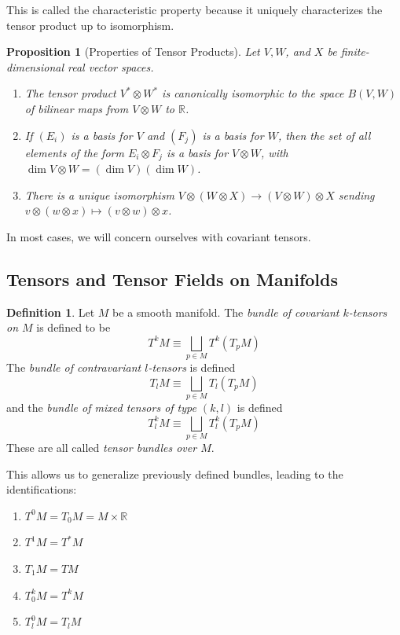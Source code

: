 \documentclass{article}
\newtheorem{proposition}[theorem]{Proposition}
\theoremstyle{remark}
\theoremstyle{definition}
\newtheorem{definition}{Definition}[section]
\begin{document}
This is called the characteristic property because it uniquely characterizes the tensor product up to isomorphism. 

\begin{proposition}[Properties of Tensor Products]
Let $V, W$, and $X$ be finite-dimensional real vector spaces. 
\begin{enumerate}
    \item The tensor product $V^* \otimes W^*$ is canonically isomorphic to the space $B(V, W)$ of bilinear maps from $V \otimes W$ to $\mathbb{R}$. 
    \item If $(E_i)$ is a basis for $V$ and $(F_j)$ is a basis for $W$, then the set of all elements of the form $E_i \otimes F_j$ is a basis for $V \otimes W$, with $\dim{V\otimes W} = (\dim{V}) (\dim{W})$. 
    \item There is a unique isomorphism $V \otimes (W \otimes X) \longrightarrow (V \otimes W) \otimes X$ sending $v \otimes (w \otimes x) \mapsto (v \otimes w) \otimes x$. 
\end{enumerate}
\end{proposition}

In most cases, we will concern ourselves with covariant tensors. 

\subsection{Tensors and Tensor Fields on Manifolds}

\begin{definition}
Let $M$ be a smooth manifold. The \textit{bundle of covariant $k$-tensors on $M$} is defined to be 
\[T^k M \equiv \bigsqcup_{p \in M} T^k (T_p M)\]
The \textit{bundle of contravariant $l$-tensors} is defined
\[T_l M \equiv \bigsqcup_{p \in M} T_l (T_p M)\]
and the \textit{bundle of mixed tensors of type $(k, l)$} is defined
\[T^k_l M \equiv \bigsqcup_{p \in M} T_l^k (T_p M)\]
These are all called \textit{tensor bundles over $M$}. 
\end{definition}

This allows us to generalize previously defined bundles, leading to the identifications: 
\begin{enumerate}
    \item $T^0 M = T_0 M = M \times \mathbb{R}$
    \item $T^1 M = T^* M$
    \item $T_1 M = T M$
    \item $T^k_0 M = T^k M$
    \item $T^0_l M = T_l M$
\end{enumerate}
\end{document}

